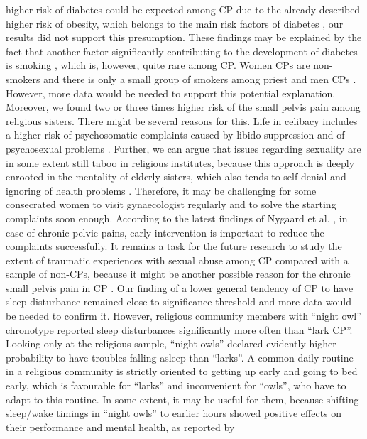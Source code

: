 \documentclass[ijerph,article,accept,moreauthors,pdftex]{mdpi}
\begin{document}
higher risk of diabetes could be expected among CP due to the already
described higher risk of obesity, which belongs to the main risk factors
of diabetes \citep{brovz2020prevalence}, our results did not support
this presumption. These findings may be explained by the fact that
another factor significantly contributing to the development of diabetes
is smoking \citep{brovz2020prevalence}, which is, however, quite rare
among CP. Women CPs are non-smokers \citep{butler1996trends} and there
is only a small group of smokers among priest and men CPs
\citep{stang2012cancer}. However, more data would be needed to support
this potential explanation. Moreover, we found two or three times higher
risk of the small pelvis pain among religious sisters. There might be
several reasons for this. Life in celibacy includes a higher risk of
psychosomatic complaints caused by libido-suppression and of
psychosexual problems \citep{baumann2019spiritual}. Further, we can
argue that issues regarding sexuality are in some extent still taboo in
religious institutes, because this approach is deeply enrooted in the
mentality of elderly sisters, which also tends to self-denial and
ignoring of health problems \citep{jakvsivcova2021sluzebnici}.
Therefore, it may be challenging for some consecrated women to visit
gynaecologist regularly and to solve the starting complaints soon
enough. According to the latest findings of Nygaard et al.
\citep{nygaard2020baseline}, in case of chronic pelvic pains, early
intervention is important to reduce the complaints successfully. It
remains a task for the future research to study the extent of traumatic
experiences with sexual abuse among CP compared with a sample of
non-CPs, because it might be another possible reason for the chronic
small pelvis pain in CP \citep{heim1998abuse}. Our finding of a lower
general tendency of CP to have sleep disturbance remained close to
significance threshold and more data would be needed to confirm it.
However, religious community members with ``night owl'' chronotype
reported sleep disturbances significantly more often than ``lark CP''.
Looking only at the religious sample, ``night owls'' declared evidently
higher probability to have troubles falling asleep than ``larks''. A
common daily routine in a religious community is strictly oriented to
getting up early and going to bed early, which is favourable for
``larks'' and inconvenient for ``owls'', who have to adapt to this
routine. In some extent, it may be useful for them, because shifting
sleep/wake timings in ``night owls'' to earlier hours showed positive
effects on their performance and mental health, as reported by
\end{document}
